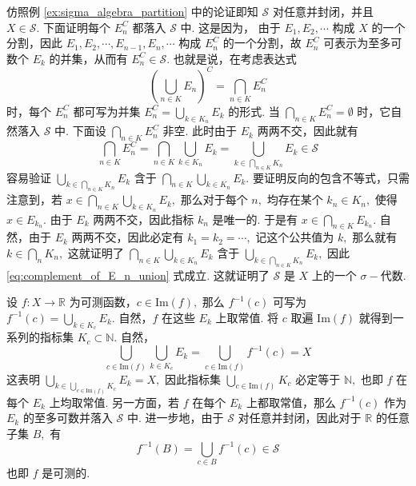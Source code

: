 \documentclass[12pt, a4paper, oneside]{book}
\numberwithin{figure}{section}
\theoremstyle{definition}
\begin{document}
仿照例 \ref{ex:sigma_algebra_partition} 中的论证即知 $\mathcal S$ 对任意并封闭，并且 $X\in\mathcal S.$ 下面证明每个 $E_n^C$ 都落入 $\mathcal S$ 中. 这是因为，
由于 $E_1,E_2,\cdots$ 构成 $X$ 的一个分割，因此 $E_1,E_2,\cdots,E_{n-1},E_n,\cdots$ 构成 $E_n^C$ 的一个分割，故 $E_n^C$ 可表示为至多可数个 $E_k$ 的并集，从而有 $E_n^C\in\mathcal S.$ 
也就是说，在考虑表达式 
\begin{equation}
    \left(\bigcup_{n\in K}E_n\right)^C=\bigcap_{n\in K} E_n^C
\end{equation}
时，每个 $E_n^C$ 都可写为并集 $E_n^C=\bigcup_{k\in K_n}E_k$ 的形式. 当 $\bigcap_{n\in K} E_n^C=\emptyset$ 时，它自然落入 $\mathcal S$ 中. 下面设 $\bigcap_{n\in K}E_n^C$ 非空.
此时由于 $E_k$ 两两不交，因此就有
\begin{equation}\label{eq:complement_of_E_n_union}
    \bigcap_{n\in K} E_n^C=\bigcap_{n\in K}\bigcup_{k\in K_n}E_k = \bigcup_{k\in \bigcap_{n\in K}K_n}E_k\in\mathcal S
\end{equation}
容易验证 $\bigcup_{k\in \bigcap_{n\in K}K_n}E_k$ 含于 $\bigcap_{n\in K}\bigcup_{k\in K_n}E_k.$ 要证明反向的包含不等式，只需注意到，若 $x\in \bigcap_{n\in K}\bigcup_{k\in K_n}E_k,$ 那么对于每个 $n,$ 均存在某个 $k_n\in K_n,$ 使得 $x\in E_{k_n}.$ 由于 $E_k$ 两两不交，因此指标 $k_n$ 是唯一的. 于是有 $x\in \bigcap_{n\in K}E_{k_n}.$ 自然，由于 $E_k$ 两两不交，因此必定有 $k_1=k_2=\cdots,$ 记这个公共值为 $k,$ 那么就有 $k\in\bigcap_n K_n,$ 这就证明了 
$\bigcap_{n\in K}\bigcup_{k\in K_n}E_k$ 含于 $\bigcup_{k\in \bigcap_{n\in K}K_n}E_k,$ 因此 \eqref{eq:complement_of_E_n_union} 式成立.
这就证明了 $\mathcal S$ 是 $X$ 上的一个 $\sigma-$代数.

设 $f:X\to\mathbb R$ 为可测函数，$c\in\mathrm{Im}(f),$ 那么 $f^{-1}(c)$ 可写为 $f^{-1}(c)=\bigcup_{k\in K_c}E_k.$ 自然，$f$ 在这些 $E_k$ 上取常值. 将 $c$ 取遍 $\mathrm{Im}(f)$ 就得到一系列的指标集 $K_c\subset \mathbb N.$ 自然， 
\begin{equation}
    \bigcup_{c\in\mathrm{Im}(f)}\bigcup_{k\in K_c}E_k=\bigcup_{c\in \mathrm{Im}(f)} f^{-1}(c)=X
\end{equation}
这表明 $\bigcup_{k\in\bigcup_{c\in\mathrm{Im}(f)}K_c}E_k=X,$ 因此指标集 $\bigcup_{c\in \mathrm{Im}(f)}K_c$ 必定等于 $\mathbb N,$ 也即 $f$ 在每个 $E_k$ 上均取常值. 
另一方面，若 $f$ 在每个 $E_k$ 上都取常值，那么 $f^{-1}(c)$ 作为 $E_k$ 的至多可数并落入 $\mathcal S$ 中. 进一步地，由于 $\mathcal S$ 对任意并封闭，因此对于 $\mathbb R$ 的任意子集 $B,$ 有 
\begin{equation}
    f^{-1}(B)=\bigcup_{c\in B}f^{-1}(c)\in\mathcal S
\end{equation}
也即 $f$ 是可测的.
\end{document}
